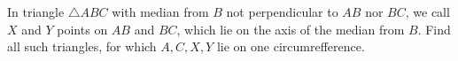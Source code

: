 In triangle $\triangle ABC$ with median from $B$ not perpendicular to $AB$ nor $BC$, we call $X$ and $Y$ points on $AB$ and $BC$, which lie on the axis of the median from $B$. Find all such triangles, for which $A,C,X,Y$ lie on one circumrefference.